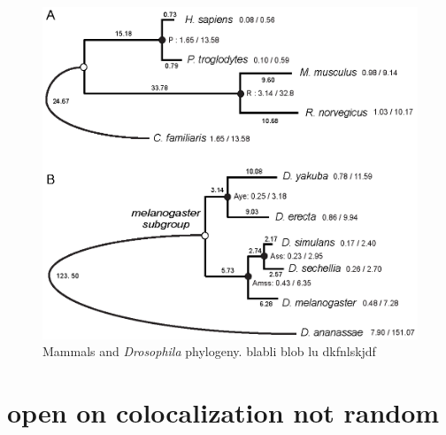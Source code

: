 \begin{figure}[htpb] 
\centering 
\includegraphics[width=\textwidth]{Part_I/Chapter_1/pictures/phylogenies.png}
\caption[Mammals and \textit{Drosophila} phylogeny]{Mammals and
  \textit{Drosophila} phylogeny. blabli blob lu dkfnlskjdf}
\label{fig:phylogeny}
\end{figure}


\section{open on colocalization \rightarrow not random}

